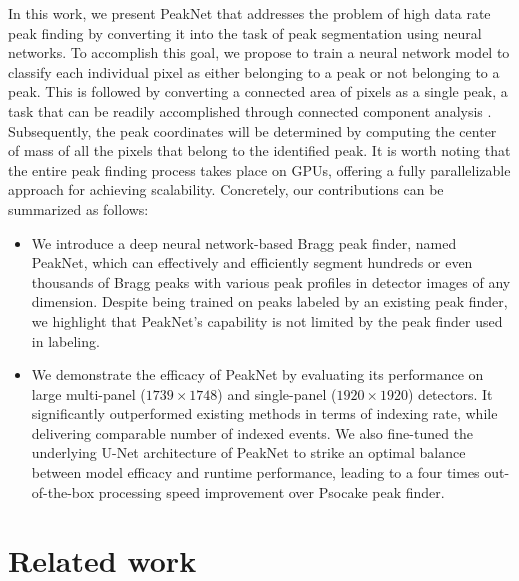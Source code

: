 \documentclass[conference]{IEEEtran}
\newcommand{\peaknet}{PeakNet}
\newcommand{\psocake}{Psocake}
\begin{document}
In this work, we present \peaknet{} that addresses the problem of high data rate
peak finding by converting it into the task of peak segmentation using neural
networks.  To accomplish this goal, we propose to train a neural network model
to classify each individual pixel as either belonging to a peak or not belonging
to a peak.  This is followed by converting a connected area of pixels as a
single peak, a task that can be readily accomplished through connected component
analysis \citep{weaverCentrosymmetricCrossSymmetricMatrices1985}.  Subsequently,
the peak coordinates will be determined by computing the center of mass of all
the pixels that belong to the identified peak.  It is worth noting that the
entire peak finding process takes place on GPUs, offering a fully parallelizable
approach for achieving scalability.  Concretely, our contributions can be
summarized as follows:

\begin{itemize}

    \item We introduce a deep neural network-based Bragg peak finder, named
    \peaknet{}, which can effectively and efficiently segment hundreds or even
    thousands of Bragg peaks with various peak profiles in detector images of
    any dimension.  Despite being trained on peaks labeled by an existing peak
    finder, we highlight that \peaknet{}'s capability is not limited by the peak
    finder used in labeling.

    \item We demonstrate the efficacy of \peaknet{} by evaluating its
    performance on large multi-panel ($1739 \times 1748$) and single-panel
    ($1920 \times 1920$) detectors.  It significantly outperformed existing
    methods in terms of indexing rate, while delivering comparable number of
    indexed events.  We also fine-tuned the underlying U-Net architecture of
    \peaknet{} to strike an optimal balance between model efficacy and runtime
    performance, leading to a four times out-of-the-box processing speed
    improvement over \psocake{} peak finder.

\end{itemize}


\section{Related work}
\end{document}

